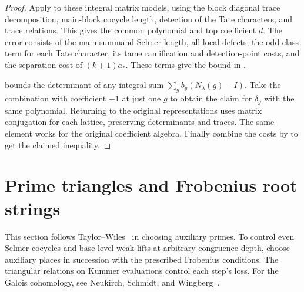 \begin{proof}
Apply  to these integral matrix models, using the block diagonal trace decomposition, main-block cocycle length, detection of the Tate characters, and trace relations. This gives the common polynomial and top coefficient $d$.
The error consists of the main-summand Selmer length, all local defects, the odd class term for each Tate character, its tame ramification and detection-point costs, and the separation cost of $(k+1)a_*$. These terms give the bound in .

 bounds the determinant of any integral sum $\sum_g b_g(N_\lambda(g)-I)$. Take the combination with coefficient $-1$ at just one $g$ to obtain the claim for $\delta_g$ with the same polynomial.
Returning to the original representations uses matrix conjugation for each lattice, preserving determinants and traces. The same element works for the original coefficient algebra.
Finally combine the costs by  to get the claimed inequality.
\end{proof}

\section{Prime triangles and Frobenius root strings}
\label{sec:c-prime-triangle}

This section follows Taylor--Wiles~\cite{TaylorWiles1995} in choosing auxiliary primes. To control even Selmer cocycles and base-level weak lifts at arbitrary congruence depth, choose auxiliary places in succession with the prescribed Frobenius conditions. The triangular relations on Kummer evaluations control each step's loss. For the Galois cohomology, see Neukirch, Schmidt, and Wingberg~\cite{NSW2008}.

